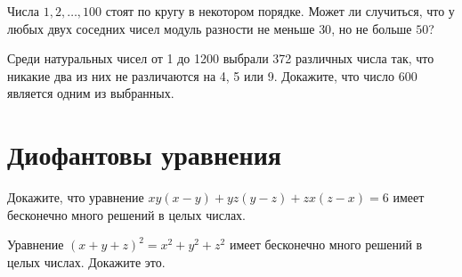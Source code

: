 \documentclass[12pt]{article}
\begin{document}
\begin{task} Числа $1, 2, \dots, 100$ стоят по кругу в некотором порядке. Может ли случиться, что у любых двух соседних чисел модуль разности не меньше $30$, но не больше $50$?
\end{task}

\begin{task}
Среди натуральных чисел от 1 до 1200 выбрали 372 различных числа так, что никакие два из них не различаются на 4, 5 или 9. Докажите, что число 600 является одним из выбранных. 
\end{task}


\section*{Диофантовы уравнения}

\begin{task}
Докажите, что уравнение $xy(x-y)+yz(y-z)+zx(z-x) = 6 $ имеет бесконечно много решений в целых числах.
\end{task}

\begin{task}
Уравнение $(x + y + z)^{2} = x^{2} + y^{2} + z^{2}$ имеет бесконечно много решений в целых числах. Докажите это.
\end{task}
\end{document}
